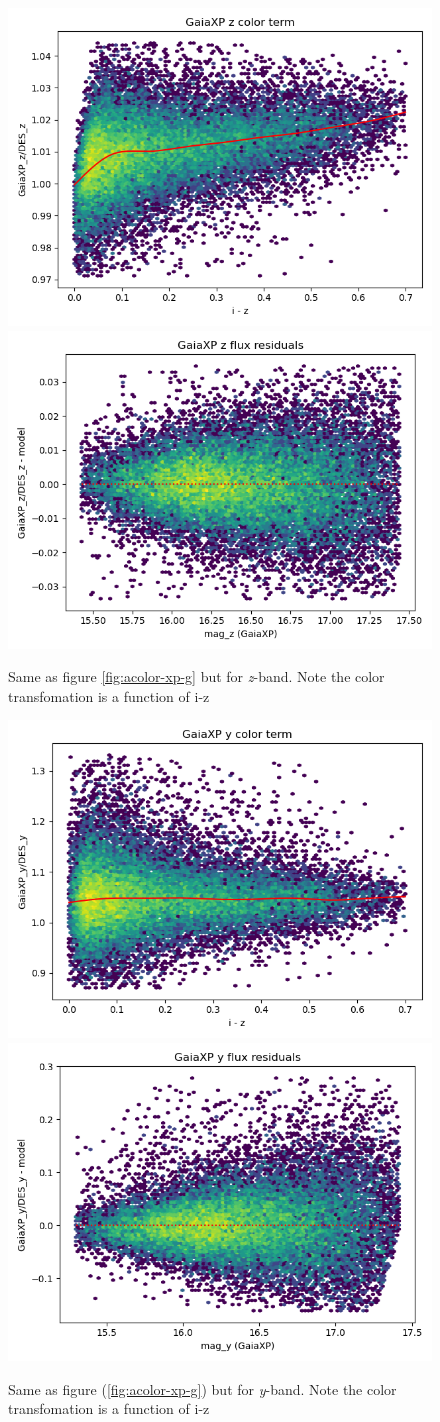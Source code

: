 \begin{figure}
    \includegraphics[width=0.49\linewidth]{./figures/color_terms/GaiaXP_to_DES_band_z_color_term.png}
    \includegraphics[width=0.49\linewidth]{./figures/color_terms/GaiaXP_to_DES_band_z_flux_residuals.png}
    \caption{Same as figure \ref{fig:acolor-xp-g} but for \textit{z}-band. Note the color transfomation is a function of i-z}
\end{figure}
\begin{figure}
    \includegraphics[width=0.49\linewidth]{./figures/color_terms/GaiaXP_to_DES_band_y_color_term.png}
    \includegraphics[width=0.49\linewidth]{./figures/color_terms/GaiaXP_to_DES_band_y_flux_residuals.png}
    \caption{Same as figure (\ref{fig:acolor-xp-g}) but for \textit{y}-band. Note the color transfomation is a function of i-z}
\end{figure}


